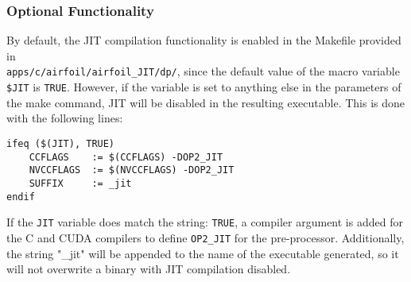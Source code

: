 \subsubsection{Optional Functionality}
By default, the JIT compilation functionality is enabled in the Makefile provided in \\\verb|apps/c/airfoil/airfoil_JIT/dp/|, since the default value of the macro variable \verb|$JIT| is \verb|TRUE|. However, if the variable is set to anything else in the parameters of the make command, JIT will be disabled in the resulting executable. This is done with the following lines:
\begin{lstlisting}[linewidth = \textwidth, framesep=0pt]
ifeq ($(JIT), TRUE)
	CCFLAGS    := $(CCFLAGS) -DOP2_JIT
	NVCCFLAGS  := $(NVCCFLAGS) -DOP2_JIT
	SUFFIX     := _jit
endif
\end{lstlisting}
If the \verb|JIT| variable does match the string: \verb|TRUE|, a compiler argument is added for the C and CUDA compilers to define \verb|OP2_JIT| for the pre-processor. Additionally, the string "\_jit" will be appended to the name of the executable generated, so it will not overwrite a binary with JIT compilation disabled.
